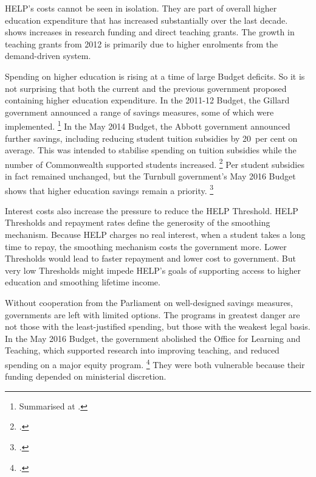 \documentclass{grattan}
\begin{document}
\gls{HELP}'s costs cannot be seen in isolation.
They are part of overall higher education expenditure that has increased substantially over the last decade.
 shows increases in research funding and direct teaching grants.
The growth in teaching grants from 2012 is primarily due to higher enrolments from the demand-driven system.

Spending on higher education is rising at a time of large Budget deficits.
So it is not surprising that both the current and the previous government proposed containing higher education expenditure.
In the 2011-12 Budget, the Gillard government announced a range of savings measures, some of which were implemented.%
   \footnote{Summarised at \textcite[][12]{Warburton2016ResourcingAustraliastertiary}.}
In the May 2014 Budget, the Abbott government announced further savings, including reducing student tuition subsidies by 20~per cent on average.
This was intended to stabilise spending on tuition subsidies while the number of \gls{Commonwealth supported} students increased.%
   \footnote{\textcite[][67--69]{Education2014Portfoliobudgetstatements}.} 
Per student subsidies in fact remained unchanged, but the Turnbull government's May 2016 Budget shows that higher education savings remain a priority.%
\footcite{Education2016DrivingInnovationFairness}

Interest costs also increase the pressure to reduce the \gls{HELP} \gls{Threshold}.
\gls{HELP} \gls{Threshold}s and repayment rates define the generosity of the smoothing mechanism.
Because \gls{HELP} charges no real interest, when a student takes a long time to repay, the smoothing mechanism costs the government more.
Lower \gls{Threshold}s would lead to faster repayment and lower cost to government.
But very low \gls{Threshold}s might impede \gls{HELP}'s goals of supporting access to higher education and smoothing lifetime income.

Without cooperation from the Parliament on well-designed savings measures, governments are left with limited options.
The programs in greatest danger are not those with the least-justified spending, but those with the weakest legal basis.
In the May 2016 Budget, the government abolished the Office for Learning and Teaching, which supported research into improving teaching, and reduced spending on a major equity program.%
   \footnote{\textcite[][57]{Education2016Portfoliobudgetstatements}.} 
They were both vulnerable because their funding depended on ministerial discretion.
\end{document}

